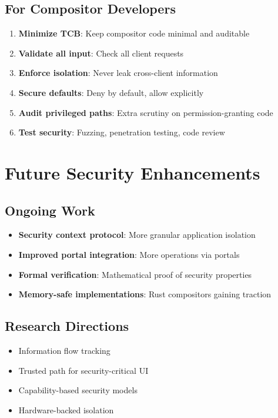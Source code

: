\subsection{For Compositor Developers}

\begin{enumerate}
    \item \textbf{Minimize TCB}: Keep compositor code minimal and auditable
    \item \textbf{Validate all input}: Check all client requests
    \item \textbf{Enforce isolation}: Never leak cross-client information
    \item \textbf{Secure defaults}: Deny by default, allow explicitly
    \item \textbf{Audit privileged paths}: Extra scrutiny on permission-granting code
    \item \textbf{Test security}: Fuzzing, penetration testing, code review
\end{enumerate}

\section{Future Security Enhancements}

\subsection{Ongoing Work}

\begin{itemize}
    \item \textbf{Security context protocol}: More granular application isolation
    \item \textbf{Improved portal integration}: More operations via portals
    \item \textbf{Formal verification}: Mathematical proof of security properties
    \item \textbf{Memory-safe implementations}: Rust compositors gaining traction
\end{itemize}

\subsection{Research Directions}

\begin{itemize}
    \item Information flow tracking
    \item Trusted path for security-critical UI
    \item Capability-based security models
    \item Hardware-backed isolation
\end{itemize}

